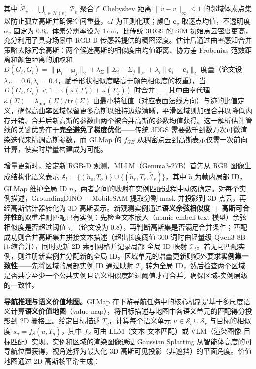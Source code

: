 其中 $\tilde{\mathcal{P}}_v = \bigcup_{\tilde{v} \in \mathcal{N}(v)} \mathcal{P}_{\tilde{v}}$ 聚合了 Chebyshev 距离 $\|\tilde{v} - v\|_\infty \leq 1$ 的邻域体素点集以防止孤立高斯并确保空间重叠，$\epsilon I$ 为正则化项；颜色 $\mathbf{c}_v$ 取逐点均值，不透明度 $\alpha_v$ 固定为 0.8。体素分辨率设为 1\,cm，比传统 3DGS 的 SfM 初始点云密度更高，充分利用了具身场景中 RGB-D 传感器提供的稠密深度。估计后通过曲率感知合并策略去除冗余高斯：两个候选高斯的相似度由均值距离、协方差 Frobenius 范数距离和颜色距离的加权和 $D(G_i, G_j) = \|\boldsymbol{\mu}_i - \boldsymbol{\mu}_j\|_2 + \lambda_\Sigma\|\Sigma_i - \Sigma_j\|_F + \lambda_c\|\mathbf{c}_i - \mathbf{c}_j\|_2$ 度量（论文设 $\lambda_\Sigma=0.6, \lambda_c=0.4$，赋予形状相似度略高于颜色相似度的权重），当 $D(G_i, G_j) < 1 + \tau(\kappa(\Sigma_i) + \kappa(\Sigma_j))$ 时合并——其中曲率代理 $\kappa(\Sigma) = \lambda_{\min}(\Sigma)/\text{tr}(\Sigma)$ 由最小特征值（对应表面法线方向）与迹的比值定义，确保高曲率区域保留更多高斯以维持边缘清晰，平滑区域则加强合并以降低内存开销。合并后新高斯的参数由两个被合并高斯的参数均值获得。这一解析估计管线的关键优势在于\textbf{完全避免了梯度优化}——传统 3DGS 需要数千到数万次可微渲染迭代来精调高斯参数，而 GLMap 的 $f_{GE}$ 从稠密点云到高斯表示仅需一次前向计算，使实时增量构建成为可能。

增量更新时，给定新 RGB-D 观测，MLLM（Gemma3-27B）首先从 RGB 图像生成结构化语义表示 $\mathcal{S}_t = \{(\tilde{n}_o, T_o)\} \cup \{(\tilde{n}_r, T_r, \tilde{\mathcal{I}}_r)\}$，其中 $\tilde{n}$ 为帧内局部 ID，GLMap 维护全局 ID $n$，两者之间的映射在实例匹配过程中动态确定。对每个实例描述，GroundingDINO + MobileSAM 提取分割 mask 并投影到 3D 点云，再经高斯估计器转化为 3D 高斯表示。新观测实例通过\textbf{语义余弦相似度 + 高斯可合并性}的双重准则匹配已有实例：先检查文本嵌入（nomic-embed-text 模型）余弦相似度是否超过阈值 $\tau_s$（论文设为 0.8），再判断高斯集是否满足合并条件；匹配成功则合并高斯集并拼接文本描述（超出长度阈值 300 词时由轻量级 Qwen3-8B 压缩合并），同时更新 2D 索引网格并记录局部-全局 ID 映射 $\mathcal{T}_t$。若无可匹配实例，则注册新实例并分配新的全局 ID。区域单元的增量更新则额外要求\textbf{实例集一致性}——先将区域的局部实例 ID 通过映射 $\mathcal{T}_t$ 转为全局 ID，然后检查两个区域是否共享至少一个公共实例且语义相似度超过阈值才可合并，确保区域-实例层级的一致性。

\textbf{导航推理与语义价值地图。}GLMap 在下游导航任务中的核心机制是基于多尺度语义计算\textbf{语义价值地图}（value map），将目标描述与地图中各语义单元的匹配得分投影到 2D 栅格上。给定目标描述 $T_g$，计算每个语义单元 $u \in \mathcal{S}_o \cup \mathcal{S}_r$ 与目标的相似度 $s_u = f_S(u, T_g)$，其中 $f_S$ 可由 LLM（文本-文本匹配）或 VLM（渲染图像-目标匹配）实现。实例和区域的渲染图像通过 Gaussian Splatting 从智能体高度的可导航位置获得，视角选择为最大化 3D 高斯可见投影（非遮挡）的平面角度。价值地图通过 2D 高斯核平滑生成：

